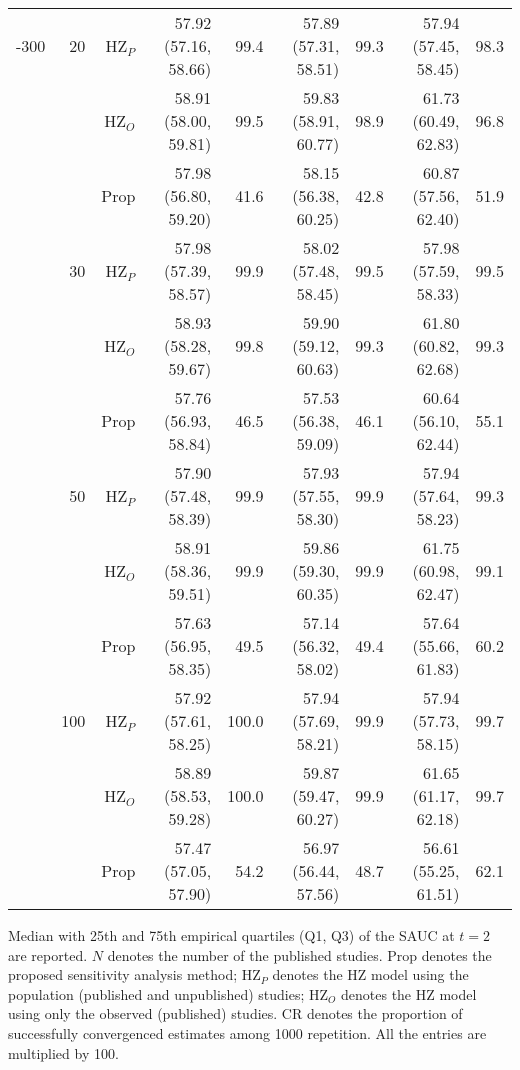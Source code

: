 \begin{table}[!htb]
\begin{threeparttable}
\begin{tabular}[t]{rrrrrrrrr}
\addlinespace
50-300 & 20 & HZ$_P$ & 57.92 (57.16, 58.66) & 99.4 & 57.89 (57.31, 58.51) & 99.3 & 57.94 (57.45, 58.45) & 98.3\\
 &  & HZ$_O$ & 58.91 (58.00, 59.81) & 99.5 & 59.83 (58.91, 60.77) & 98.9 & 61.73 (60.49, 62.83) & 96.8\\
 &  & Prop & 57.98 (56.80, 59.20) & 41.6 & 58.15 (56.38, 60.25) & 42.8 & 60.87 (57.56, 62.40) & 51.9\\
\addlinespace
 & 30 & HZ$_P$ & 57.98 (57.39, 58.57) & 99.9 & 58.02 (57.48, 58.45) & 99.5 & 57.98 (57.59, 58.33) & 99.5\\
 &  & HZ$_O$ & 58.93 (58.28, 59.67) & 99.8 & 59.90 (59.12, 60.63) & 99.3 & 61.80 (60.82, 62.68) & 99.3\\
 &  & Prop & 57.76 (56.93, 58.84) & 46.5 & 57.53 (56.38, 59.09) & 46.1 & 60.64 (56.10, 62.44) & 55.1\\
\addlinespace
 & 50 & HZ$_P$ & 57.90 (57.48, 58.39) & 99.9 & 57.93 (57.55, 58.30) & 99.9 & 57.94 (57.64, 58.23) & 99.3\\
 &  & HZ$_O$ & 58.91 (58.36, 59.51) & 99.9 & 59.86 (59.30, 60.35) & 99.9 & 61.75 (60.98, 62.47) & 99.1\\
 &  & Prop & 57.63 (56.95, 58.35) & 49.5 & 57.14 (56.32, 58.02) & 49.4 & 57.64 (55.66, 61.83) & 60.2\\
\addlinespace
 & 100 & HZ$_P$ & 57.92 (57.61, 58.25) & 100.0 & 57.94 (57.69, 58.21) & 99.9 & 57.94 (57.73, 58.15) & 99.7\\
 &  & HZ$_O$ & 58.89 (58.53, 59.28) & 100.0 & 59.87 (59.47, 60.27) & 99.9 & 61.65 (61.17, 62.18) & 99.7\\
 &  & Prop & 57.47 (57.05, 57.90) & 54.2 & 56.97 (56.44, 57.56) & 48.7 & 56.61 (55.25, 61.51) & 62.1\\
\bottomrule
\end{tabular}
\begin{tablenotes}
\item 
			Median with 25th and 75th empirical quartiles (Q1, Q3) of the SAUC at $t=2$ are reported. 
			$N$ denotes the number of the published studies. 
			Prop denotes the proposed sensitivity analysis method;
			HZ$_P$ denotes the HZ model using the population (published and unpublished) studies; 
			HZ$_O$ denotes the HZ model using only the observed (published) studies.
			CR denotes the proportion of successfully convergenced estimates among 1000 repetition.
			All the entries are multiplied by 100.
\end{tablenotes}
\end{threeparttable}
\end{table}
